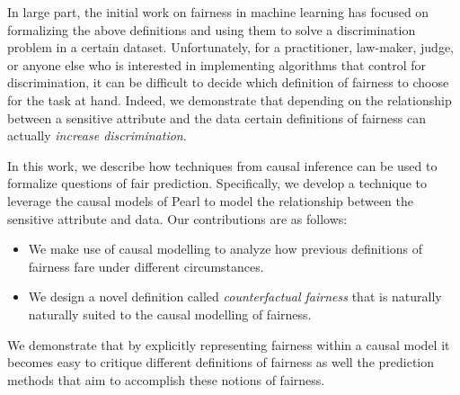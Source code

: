 In large part, the initial work on fairness in machine learning has focused on formalizing the above definitions and using them to solve a discrimination problem in a certain dataset. Unfortunately, for a practitioner, law-maker, judge, or anyone else who is interested in implementing algorithms that control for discrimination, it can be difficult to decide which definition of fairness to choose for the task at hand. Indeed, we demonstrate that depending on the relationship between a sensitive attribute and the data certain definitions of fairness can actually \emph{increase discrimination}.

% 

In this work, we describe how techniques from causal inference can be used to formalize questions of fair prediction. Specifically, we develop a technique to leverage the causal models of Pearl \cite{pearl2009causal} to model the relationship between the sensitive attribute and data. Our contributions are as follows:
\begin{itemize}
    \item We make use of causal modelling to analyze how previous definitions of fairness fare under different circumstances.
    \item We design a novel definition called \emph{counterfactual fairness} that is naturally naturally suited to the causal modelling of fairness.
\end{itemize}
We demonstrate that by explicitly representing fairness within a causal model it becomes easy to critique different definitions of fairness as well the prediction methods that aim to accomplish these notions of fairness.











